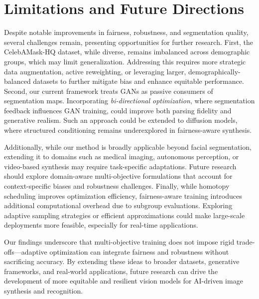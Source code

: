 \vspace{-5mm}
\section{Limitations and Future Directions}
\label{sec:future}

Despite notable improvements in fairness, robustness, and segmentation quality, several challenges remain, presenting opportunities for further research.  First, the CelebAMask-HQ dataset, while diverse, remains imbalanced across demographic groups, which may limit generalization. Addressing this requires more strategic data augmentation, active reweighting, or leveraging larger, demographically-balanced datasets to further mitigate bias and enhance equitable performance. Second, our current framework treats GANs as passive consumers of segmentation maps. Incorporating \textit{bi-directional optimization}, where segmentation feedback influences GAN training, could improve both parsing fidelity and generative realism. Such an approach could be extended to diffusion models, where structured conditioning remains underexplored in fairness-aware synthesis.  

Additionally, while our method is broadly applicable beyond facial segmentation, extending it to domains such as medical imaging, autonomous perception, or video-based synthesis may require task-specific adaptations. Future research should explore domain-aware multi-objective formulations that account for context-specific biases and robustness challenges. Finally, while homotopy scheduling improves optimization efficiency, fairness-aware training introduces additional computational overhead due to subgroup evaluations. Exploring adaptive sampling strategies or efficient approximations could make large-scale deployments more feasible, especially for real-time applications.  

 Our findings underscore that multi-objective training does not impose rigid trade-offs—adaptive optimization can integrate fairness and robustness without sacrificing accuracy. By extending these ideas to broader datasets, generative frameworks, and real-world applications, future research can drive the development of more equitable and resilient vision models for AI-driven image synthesis and recognition.
